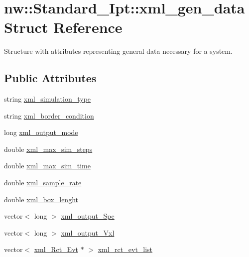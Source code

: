 \hypertarget{structnw_1_1_standard___ipt_1_1xml__gen__data}{\section{nw\+:\+:Standard\+\_\+\+Ipt\+:\+:xml\+\_\+gen\+\_\+data Struct Reference}
\label{structnw_1_1_standard___ipt_1_1xml__gen__data}
}


Structure with attributes representing general data necessary for a system.  


\subsection*{Public Attributes}
\begin{DoxyCompactItemize}
\item 
string \hyperlink{structnw_1_1_standard___ipt_1_1xml__gen__data_a68513493e94011fcaacbd9049808017d}{xml\+\_\+simulation\+\_\+type}
\item 
string \hyperlink{structnw_1_1_standard___ipt_1_1xml__gen__data_adc59bb5516c7b0c34463e5c1b446bf6a}{xml\+\_\+border\+\_\+condition}
\item 
long \hyperlink{structnw_1_1_standard___ipt_1_1xml__gen__data_a942847ef13274b631a767f65d0a5ff3c}{xml\+\_\+output\+\_\+mode}
\item 
double \hyperlink{structnw_1_1_standard___ipt_1_1xml__gen__data_a757ebd2e9fd83412731faf6bb2059dd5}{xml\+\_\+max\+\_\+sim\+\_\+steps}
\item 
double \hyperlink{structnw_1_1_standard___ipt_1_1xml__gen__data_a2b0da231be5d3a1e159730a63008950b}{xml\+\_\+max\+\_\+sim\+\_\+time}
\item 
double \hyperlink{structnw_1_1_standard___ipt_1_1xml__gen__data_ab5ae087bdf7edb268aca5b736c7cde27}{xml\+\_\+sample\+\_\+rate}
\item 
double \hyperlink{structnw_1_1_standard___ipt_1_1xml__gen__data_aa778758339d3c6beb926e4df3341e5a2}{xml\+\_\+box\+\_\+lenght}
\item 
vector$<$ long $>$ \hyperlink{structnw_1_1_standard___ipt_1_1xml__gen__data_a9bbeaad11219c26143f2c45915caeabc}{xml\+\_\+output\+\_\+\+Spc}
\item 
vector$<$ long $>$ \hyperlink{structnw_1_1_standard___ipt_1_1xml__gen__data_a6a41a161744c03226daa444501a2df6c}{xml\+\_\+output\+\_\+\+Vxl}
\item 
vector$<$ \hyperlink{structnw_1_1_standard___ipt_1_1xml___rct___evt}{xml\+\_\+\+Rct\+\_\+\+Evt} $\ast$ $>$ \hyperlink{structnw_1_1_standard___ipt_1_1xml__gen__data_abc4e7ae5a154343c1d3d25917bd58a5f}{xml\+\_\+rct\+\_\+evt\+\_\+list}

\end{DoxyCompactItemize}
